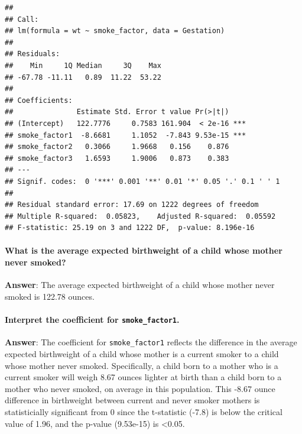 \documentclass[]{article}
\let\oldparagraph\paragraph
\renewcommand{\paragraph}[1]{\oldparagraph{#1}\mbox{}}
\begin{document}
\begin{verbatim}
## 
## Call:
## lm(formula = wt ~ smoke_factor, data = Gestation)
## 
## Residuals:
##    Min     1Q Median     3Q    Max 
## -67.78 -11.11   0.89  11.22  53.22 
## 
## Coefficients:
##               Estimate Std. Error t value Pr(>|t|)    
## (Intercept)   122.7776     0.7583 161.904  < 2e-16 ***
## smoke_factor1  -8.6681     1.1052  -7.843 9.53e-15 ***
## smoke_factor2   0.3066     1.9668   0.156    0.876    
## smoke_factor3   1.6593     1.9006   0.873    0.383    
## ---
## Signif. codes:  0 '***' 0.001 '**' 0.01 '*' 0.05 '.' 0.1 ' ' 1
## 
## Residual standard error: 17.69 on 1222 degrees of freedom
## Multiple R-squared:  0.05823,    Adjusted R-squared:  0.05592 
## F-statistic: 25.19 on 3 and 1222 DF,  p-value: 8.196e-16
\end{verbatim}

\hypertarget{what-is-the-average-expected-birthweight-of-a-child-whose-mother-never-smoked}{%
\paragraph{What is the average expected birthweight of a child whose
mother never
smoked?}\label{what-is-the-average-expected-birthweight-of-a-child-whose-mother-never-smoked}}

\textbf{Answer}: The average expected birthweight of a child whose
mother never smoked is 122.78 ounces.

\hypertarget{interpret-the-coefficient-for-smoke_factor1.}{%
\paragraph{\texorpdfstring{Interpret the coefficient for
\texttt{smoke\_factor1}.}{Interpret the coefficient for smoke\_factor1.}}\label{interpret-the-coefficient-for-smoke_factor1.}}

\textbf{Answer}: The coefficient for \texttt{smoke\_factor1} reflects
the difference in the average expected birthweight of a child whose
mother is a current smoker to a child whose mother never smoked.
Specifically, a child born to a mother who is a current smoker will
weigh 8.67 ounces lighter at birth than a child born to a mother who
never smoked, on average in this population. This -8.67 ounce difference
in birthweight between current and never smoker mothers is
statisticially significant from 0 since the t-statistic (-7.8) is below
the critical value of 1.96, and the p-value (9.53e-15) is
\textless{}0.05.
\end{document}
